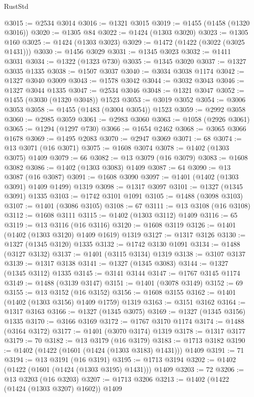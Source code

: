 \begin{lexlean}{RustStd}
\begin{coremodule}
@3015 := @2534 @3014
@3016 := @1321 @3015
@3019 := @1455 (@1458 (@1320 @3016))
@3020 := @1305 @84
@3022 := @1424 (@1303 @3020)
@3023 := @1305 @160
@3025 := @1424 (@1303 @3023)
@3029 := @1472 (@1422 (@3022 (@3025 @1431)))
@3030 := @1456 @3029
@3031 := @1345 @3023
@3032 := @1411 @3031
@3034 := @1322 (@1323 @730)
@3035 := @1345 @3020
@3037 := @1327 @3035 @1335
@3038 := @1507 @3037
@3040 := @3034 @3038 @1174
@3042 := @1327 @3040 @3009
@3043 := @1578 @3042
@3044 := @3032 @3043
@3046 := @1327 @3044 @1335
@3047 := @2534 @3046
@3048 := @1321 @3047
@3052 := @1455 (@3030 (@1320 @3048)) @1523
@3053 := @3019 @3052
@3054 := @3006 @3053
@3058 := @1455 (@1483 (@3004 @3054)) @1523
@3059 := @2992 @3058
@3060 := @2985 @3059
@3061 := @2983 @3060
@3063 := @1058 (@2926 @3061)
@3065 := @1294 (@1297 @730)
@3066 := @1654 @2462
@3068 := @3065 @3066 @1678
@3069 := @1495 @2083
@3070 := @2947 @3069
@3071 := 68
@3074 := @13 @3071 (@16 @3071)
@3075 := @1608 @3074
@3078 := @1402 (@1303 @3075) @1409
@3079 := 66
@3082 := @13 @3079 (@16 @3079)
@3083 := @1608 @3082
@3086 := @1402 (@1303 @3083) @1409
@3087 := 64
@3090 := @13 @3087 (@16 @3087)
@3091 := @1608 @3090
@3097 := @1401 (@1402 (@1303 @3091) @1409 @1499) @1319
@3098 := @1317 @3097
@3101 := @1327 (@1345 @3091) @1335
@3103 := @1742 @3101 @1091
@3105 := @1488 (@3098 @3103)
@3107 := @1401 (@3086 @3105)
@3108 := 67
@3111 := @13 @3108 (@16 @3108)
@3112 := @1608 @3111
@3115 := @1402 (@1303 @3112) @1409
@3116 := 65
@3119 := @13 @3116 (@16 @3116)
@3120 := @1608 @3119
@3126 := @1401 (@1402 (@1303 @3120) @1409 @1619) @1319
@3127 := @1317 @3126
@3130 := @1327 (@1345 @3120) @1335
@3132 := @1742 @3130 @1091
@3134 := @1488 (@3127 @3132)
@3137 := @1401 (@3115 @3134) @1319
@3138 := @3107 @3137
@3139 := @1317 @3138
@3141 := @1327 (@1345 @3083)
@3144 := @1327 (@1345 @3112) @1335
@3145 := @3141 @3144
@3147 := @1767 @3145 @1174
@3149 := @1488 (@3139 @3147)
@3151 := @1401 (@3078 @3149)
@3152 := 69
@3155 := @13 @3152 (@16 @3152)
@3156 := @1608 @3155
@3162 := @1401 (@1402 (@1303 @3156) @1409 @1759) @1319
@3163 := @3151 @3162
@3164 := @1317 @3163
@3166 := @1327 (@1345 @3075)
@3169 := @1327 (@1345 @3156) @1335
@3170 := @3166 @3169
@3172 := @1767 @3170 @1174
@3174 := @1488 (@3164 @3172)
@3177 := @1401 (@3070 @3174) @1319
@3178 := @1317 @3177
@3179 := 70
@3182 := @13 @3179 (@16 @3179)
@3183 := @1713 @3182
@3190 := @1402 (@1422 (@1601 (@1424 (@1303 @3183) @1431))) @1409
@3191 := 71
@3194 := @13 @3191 (@16 @3191)
@3195 := @1713 @3194
@3202 := @1402 (@1422 (@1601 (@1424 (@1303 @3195) @1431))) @1409
@3203 := 72
@3206 := @13 @3203 (@16 @3203)
@3207 := @1713 @3206
@3213 := @1402 (@1422 (@1424 (@1303 @3207) @1602)) @1409

\end{coremodule}
\end{lexlean}
